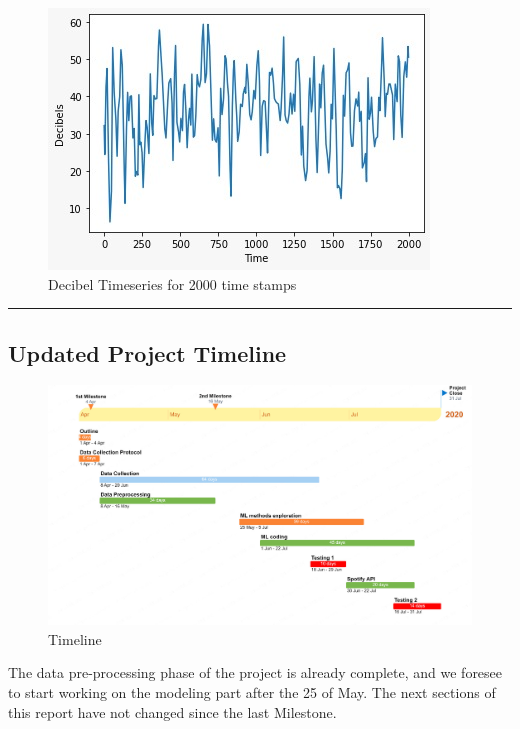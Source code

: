 \documentclass[
  12pt,
]{article}
\begin{document}
\begin{figure}
\centering
\includegraphics{Decibel.jpeg}
\caption{Decibel Timeseries for 2000 time stamps}
\end{figure}

\newpage

\begin{center}\rule{0.5\linewidth}{0.5pt}\end{center}

\hypertarget{updated-project-timeline}{%
\subsection{Updated Project Timeline}\label{updated-project-timeline}}

\begin{figure}
\centering
\includegraphics{Timeline.jpg}
\caption{Timeline}
\end{figure}

The data pre-processing phase of the project is already complete, and we
foresee to start working on the modeling part after the 25 of May. The
next sections of this report have not changed since the last Milestone.
\end{document}
